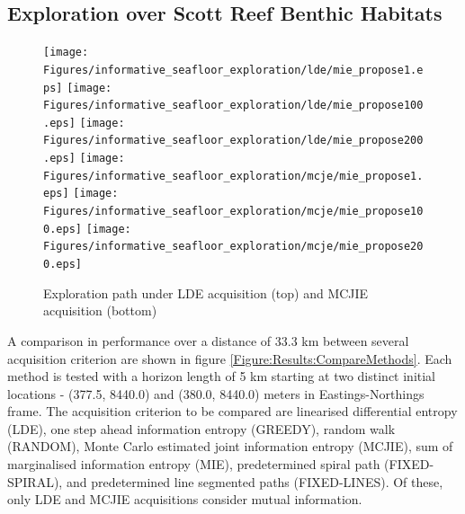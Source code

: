 \documentclass{article}
\begin{document}
			
	\subsection{Exploration over Scott Reef Benthic Habitats}
	
		\begin{figure}[t]
		\centering
			\texttt{[image: Figures/informative\_seafloor\_exploration/lde/mie\_propose1.eps]}
			\texttt{[image: Figures/informative\_seafloor\_exploration/lde/mie\_propose100.eps]}
			\texttt{[image: Figures/informative\_seafloor\_exploration/lde/mie\_propose200.eps]}
			\texttt{[image: Figures/informative\_seafloor\_exploration/mcje/mie\_propose1.eps]}
			\texttt{[image: Figures/informative\_seafloor\_exploration/mcje/mie\_propose100.eps]}
			\texttt{[image: Figures/informative\_seafloor\_exploration/mcje/mie\_propose200.eps]}	
		\caption{Exploration path under LDE acquisition (top) and MCJIE acquisition (bottom)}
		\label{Figure:Results:OptimalPaths}
		\end{figure}
		
		A comparison in performance over a distance of 33.3 km between several acquisition criterion are shown in figure \ref{Figure:Results:CompareMethods}. Each method is tested with a horizon length of 5 km starting at two distinct initial locations - (377.5, 8440.0) and (380.0, 8440.0) meters in Eastings-Northings frame. The acquisition criterion to be compared are linearised differential entropy (LDE), one step ahead information entropy (GREEDY), random walk (RANDOM), Monte Carlo estimated joint information entropy (MCJIE), sum of marginalised information entropy (MIE), predetermined spiral path (FIXED-SPIRAL), and predetermined line segmented paths (FIXED-LINES). Of these, only LDE and MCJIE acquisitions consider mutual information.
\end{document}
